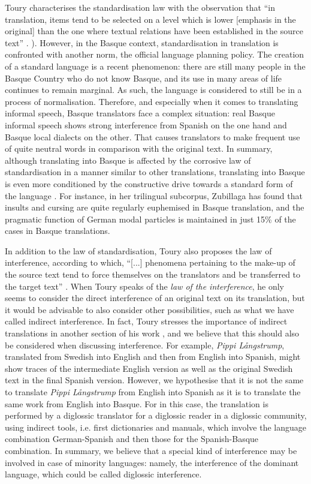 \documentclass[output=paper]{LSP/langsci}
\begin{document}
Toury characterises the standardisation law with the observation that “in translation, items tend to be selected on a level which is lower [emphasis in the original] than the one where textual relations have been established in the source text” \citep[305]{Toury2012}. ). However, in the Basque context, standardisation in translation is confronted with another norm, the official language planning policy. The creation of a standard language is a recent phenomenon: there are still many people in the Basque Country who do not know Basque, and its use in many areas of life continues to remain marginal. As such, the language is considered to still be in a process of normalisation. Therefore, and especially when it comes to translating informal speech, Basque translators face a complex situation: real Basque informal speech shows strong interference from Spanish on the one hand and Basque local dialects on the other. That causes translators to make frequent use of quite neutral words in comparison with the original text. In summary, although translating into Basque is affected by the corrosive law of standardisation in a manner similar to other translations, translating into Basque is even more conditioned by the constructive drive towards a standard form of the language \citep{Barambones2012}. For instance, in her trilingual subcorpus, Zubillaga has found that insults and cursing are quite regularly euphemised in Basque translation, and the pragmatic function of German modal particles is maintained in just 15\% of the cases in Basque translations.

In addition to the law of standardisation, Toury also proposes the law of interference, according to which, “[...] phenomena pertaining to the make-up of the source text tend to force themselves on the translators and be transferred to the target text” \citep[310]{Toury2012}. When Toury speaks of the \textit{law of the interference}, he only seems to consider the direct interference of an original text on its translation, but it would be advisable to also consider other possibilities, such as what we have called indirect interference. In fact, Toury stresses the importance of indirect translations in another section of his work \citep[129-146]{Toury1995}, and we believe that this should also be considered when discussing interference. For example, \textit{Pippi Långstrump}, translated from Swedish into English and then from English into Spanish, might show traces of the intermediate English version as well as the original Swedish text in the final Spanish version. However, we hypothesise that it is not the same to translate \textit{Pippi Långstrump} from English into Spanish as it is to translate the same work from English into Basque. For in this case, the translation is performed by a diglossic translator for a diglossic reader in a diglossic community, using indirect tools, i.e. first dictionaries and manuals, which involve the language combination German-Spanish and then those for the Spanish-Basque combination. In summary, we believe that a special kind of interference may be involved in case of minority languages: namely, the interference of the dominant language, which could be called diglossic interference.
\end{document}
